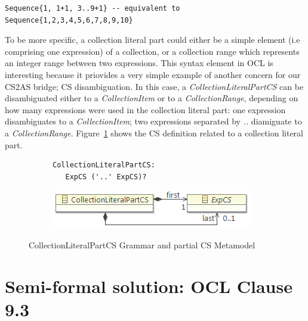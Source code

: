 \documentclass{llncs}
\begin{document}
\begin{lstlisting}[label=lst:CollectionLiteralExpExample, language=OCL]
Sequence{1, 1+1, 3..9+1} -- equivalent to Sequence{1,2,3,4,5,6,7,8,9,10}
\end{lstlisting}

To be more specific, a collection literal part could either be a simple element (i.e comprising one expression) of a collection, or a collection range which represents an integer range between two expressions. This syntax element in OCL is interesting because it priovides a very simple example of another concern for our CS2AS bridge; CS disambiguation. In this case, a \emph{CollectionLiteralPartCS} can be disambiguated either to a \emph{CollectionItem} or to a \emph{CollectionRange}, depending on how many expressions were used in the collection literal part: one expression disambiguates to a \emph{CollectionItem}; two expressions separated by \emph{..} diamiguate to a \emph{CollectionRange}. Figure~\ref{fig:CollectionLiteralPartCS} shows the CS definition related to a collection literal part. 

\begin{figure}[htbp]
\centering
\begin{subfigure}{0.5\textwidth}
  \centering
\begin{lstlisting}[language=Xtext]
CollectionLiteralPartCS:
   ExpCS ('..' ExpCS)?
\end{lstlisting} 
\end{subfigure}%
\begin{subfigure}{0.5\textwidth}
  \centering
  \includegraphics[scale=0.75]{images/CollectionLiteralPartCS.png}
\end{subfigure}
\caption{CollectionLiteralPartCS Grammar and partial CS Metamodel}
\label{fig:CollectionLiteralPartCS}
\end{figure}

\section{Semi-formal solution: OCL Clause 9.3}
\label{sec:semi-formal-solution}
\end{document}
